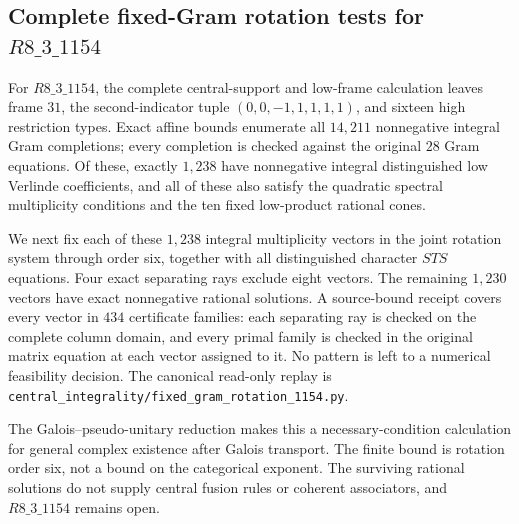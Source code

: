\subsection{Complete fixed-Gram rotation tests for $R8\_3\_1154$}
\label{subsec:frontier-fixed-gram-1154}

For $R8\_3\_1154$, the complete central-support and low-frame calculation
leaves frame $31$, the second-indicator tuple $(0,0,-1,1,1,1,1)$,
and sixteen high restriction types. Exact affine bounds enumerate all
$14{,}211$ nonnegative integral Gram completions; every completion is
checked against the original $28$ Gram equations. Of these, exactly
$1{,}238$ have nonnegative integral distinguished low Verlinde
coefficients, and all of these also satisfy the quadratic spectral
multiplicity conditions and the ten fixed low-product rational cones.

We next fix each of these $1{,}238$ integral multiplicity vectors in the
joint rotation system through order six, together with all distinguished
character $STS$ equations. Four exact separating rays exclude eight
vectors. The remaining $1{,}230$ vectors have exact nonnegative rational
solutions. A source-bound receipt covers every vector in $434$
certificate families: each separating ray is checked on the complete
column domain, and every primal family is checked in the original
matrix equation at each vector assigned to it. No pattern is left to
a numerical feasibility decision. The canonical read-only replay is
\texttt{central\_integrality/fixed\_gram\_rotation\_1154.py}.

The Galois--pseudo-unitary reduction makes this a necessary-condition
calculation for general complex existence after Galois transport.
The finite bound is rotation order six, not a bound on the categorical
exponent. The surviving rational solutions do not supply central fusion
rules or coherent associators, and $R8\_3\_1154$ remains open.
